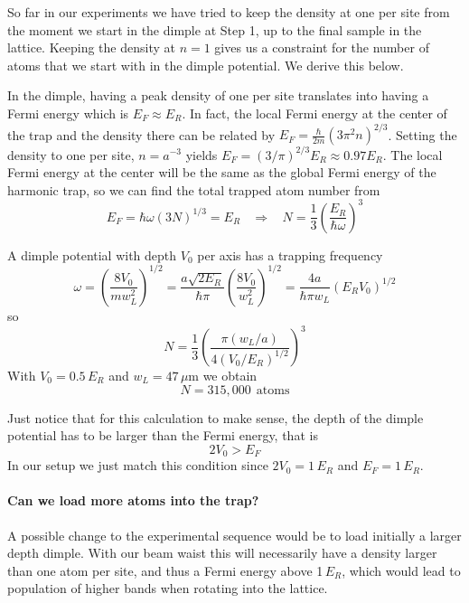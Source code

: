 \documentclass[11pt,letter]{article}
\begin{document}
So far in our experiments we have tried to keep the density at one per site
from the moment we start in the dimple at Step 1, up to the final sample in
the lattice.    Keeping the density at $n=1$ gives us a constraint for the
number of atoms that we start with in the dimple potential.   We derive this
below. 

 In the dimple, having a peak density of one per site translates into having
a Fermi energy which is $E_{F} \approx E_{R}$.    In fact, the local Fermi
energy at the center of the trap and the density there can be related by
$E_{F} = \frac{\hbar}{2m} ( 3\pi^{2} n)^{2/3}$.  Setting the density to one
per site, $n=a^{-3}$ yields  $E_{F} = (3/\pi)^{2/3} E_{R} \approx 0.97
E_{R}$.    The local Fermi energy at the center will be the same as the
global Fermi energy of the harmonic trap, so we can find the total trapped
atom number from 
\begin{equation}
  E_{F} = \hbar \omega ( 3 N )^{1/3}  = E_{R}  
 \ \ \ \  \Rightarrow  \ \ \ \  N = \frac{1}{3} 
  \left( \frac{ E_{R}} {\hbar \omega} \right)^{3} 
\end{equation} 

A dimple potential with depth $V_{0}$ per axis has a trapping frequency 
\begin{equation}
  \omega  =  \left( \frac{8V_{0} } { mw_{L}^{2} } \right)^{1/2}
  =   \frac{ a \sqrt{2E_{R}} }{ \hbar \pi} 
   \left(  \frac{8V_{0} } { w_{L}^{2} } \right)^{1/2}
  =   \frac{ 4 a  }{ \hbar \pi w_{L} } 
   \left(  E_{R}V_{0}  \right)^{1/2}
\end{equation} 
so 
\begin{equation} 
 N = \frac{1}{3} \left(  \frac{ \pi (w_{L}/a)  }{4 (V_{0}/E_{R})^{1/2}}
\right)^{3}
\end{equation}
With $V_{0} = 0.5\,E_{R}$ and $w_{L}=47\,\mu$m we obtain
\begin{equation}
 N = 315,000 \ \ \mathrm{atoms} 
\end{equation}

Just notice that for this calculation to make sense, the depth of the dimple
potential has to be larger than the Fermi energy, that is 
\begin{equation}
  2 V_{0} >  E_{F}
\end{equation} 
In our setup we just match this condition since $2V_{0}= 1\,E_{R}$ and $E_{F}
= 1\,E_{R}$.  
 
\paragraph{Can we load more atoms into the trap?}   A possible change to the
experimental sequence would be to load initially a larger depth dimple.  With
our beam waist this will necessarily  have a density larger than one atom per
site, and thus a Fermi energy above 1\,$E_{R}$, which would lead to
population of higher bands when rotating into the lattice.   
\end{document}
